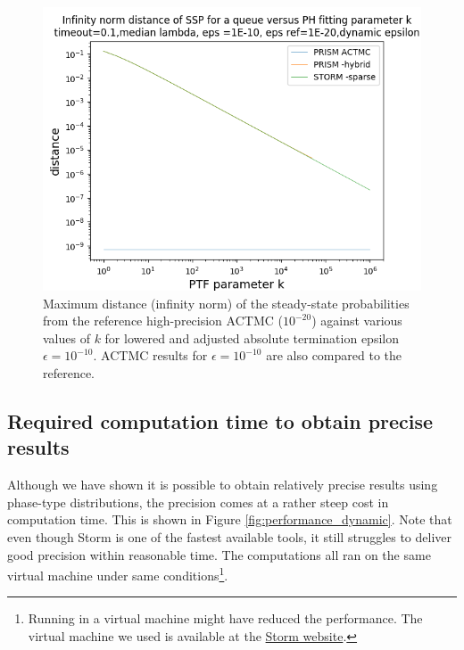 \documentclass[paper=a4, fontsize=11pt]{scrartcl}
\numberwithin{equation}{section}		%
\numberwithin{figure}{section}			%
\numberwithin{table}{section}				%
\begin{document}
	\begin{figure}[H]
		\begin{center}
			\includegraphics[trim=0.2cm 0cm 0cm 1.35cm,width=15cm, clip]{picture/New_model/1E-10/distance_dynamic_1E-10.png}
		\end{center}
		\caption{Maximum distance (infinity norm) of the steady-state probabilities from the reference high-precision ACTMC ($10^{-20}$) against various values of $k$ for lowered and adjusted absolute termination epsilon $\epsilon = 10^{-10}$. ACTMC results for $\epsilon = 10^{-10}$ are also compared to the reference.}
		\label{fig:distance_dynamic_1E-10_constant_kappa}
	\end{figure}
	
	\subsection{Required computation time to obtain precise results}
	\label{S:2.4}
	
	Although we have shown it is possible to obtain relatively precise results using phase-type distributions, the precision comes at a rather steep cost in computation time. This is shown in Figure \ref{fig:performance_dynamic}. Note that even though Storm is one of the fastest available tools, it still struggles to deliver good precision within reasonable time. The computations all ran on the same virtual machine under same conditions\footnote{Running in a virtual machine might have reduced the performance. The virtual machine we used is available at the \href{http://www.stormchecker.org/documentation/vm/vm.html}{Storm website}.}.
	
\end{document}
